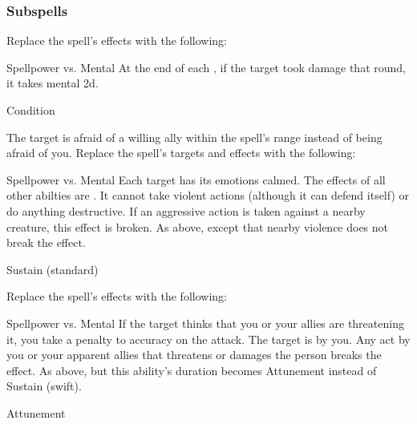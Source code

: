 \subsubsection{Subspells}
Replace the spell's effects with the following:
\begin{spellcontent}
\begin{augmenteffects}
\begin{spellattack}{Spellpower vs. Mental}
\spellsuccess At the end of each , if the target took damage that round, it takes mental  \minus2d.
\end{spellattack}
\spelldur Condition
\end{augmenteffects}
\end{spellcontent}
The target is afraid of a willing ally within the spell's range instead of being afraid of you.
Replace the spell's targets and effects with the following:
\begin{spellcontent}
\begin{augmenttargetinginfo}
\end{augmenttargetinginfo}
\begin{augmenteffects}
\begin{spellattack}{Spellpower vs. Mental}
\spellsuccess
Each target has its emotions calmed.
The effects of all other  abilties are .
It cannot take violent actions (although it can defend itself) or do anything destructive.
If an aggressive action is taken against a nearby creature, this effect is broken.
\spellcritical
As above, except that nearby violence does not break the effect.
\end{spellattack}
\spelldur Sustain (standard)
\end{augmenteffects}
\end{spellcontent}
Replace the spell's effects with the following:
\begin{spellcontent}
\begin{augmenteffects}
\begin{spellattack}{Spellpower vs. Mental}
\spellspecial If the target thinks that you or your allies are threatening it, you take a  penalty to accuracy on the attack.
\spellsuccess
The target is \charmed by you.
Any act by you or your apparent allies that threatens or damages the  person breaks the effect.
\spellcritical As above, but this ability's duration becomes Attunement instead of Sustain (swift).
\end{spellattack}
\spelldur Attunement
\end{augmenteffects}
\end{spellcontent}
